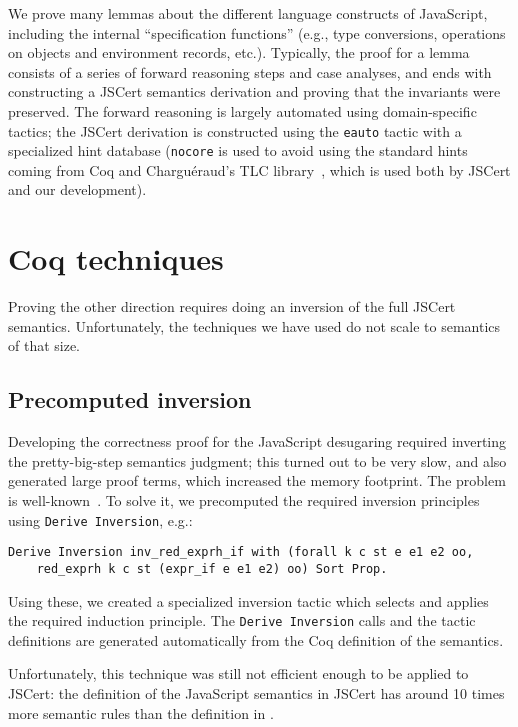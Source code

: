 \documentclass{llncs}
\begin{document}
We prove many lemmas about the different language constructs
of JavaScript, including the internal ``specification functions''
(e.g., type conversions, operations on objects and environment
records, etc.). Typically, the proof for a lemma consists of
a series of forward reasoning steps and case analyses, and ends with
constructing a JSCert semantics derivation and proving that
the invariants were preserved. The forward reasoning is largely
automated using domain-specific tactics; the JSCert derivation
is constructed using the \texttt{eauto} tactic with a specialized
hint database (\texttt{nocore} is used to avoid using the standard
hints coming from Coq and Chargu\'eraud's TLC
library~\cite{TLC}, which is
used both by JSCert and our development).

\section{Coq techniques}
\label{sec:coq-techniques}

Proving the other direction requires doing an inversion of the full JSCert
semantics. Unfortunately, the techniques we have used do not scale to semantics
of that size.

\subsection{Precomputed inversion}

Developing the correctness proof for the JavaScript desugaring required
inverting the \lambdajs pretty-big-step semantics judgment; this
turned out to be very slow, and also generated large proof terms, which 
increased the memory footprint. The problem is well-known~\cite{Monin:Coq2}.
To solve it, we precomputed the required inversion principles
using \texttt{Derive Inversion}, e.g.:
\begin{verbatim}
Derive Inversion inv_red_exprh_if with (forall k c st e e1 e2 oo,
    red_exprh k c st (expr_if e e1 e2) oo) Sort Prop.
\end{verbatim}
Using these, we created a specialized inversion tactic
which selects and applies the required induction principle.
The \texttt{Derive Inversion} calls and the tactic definitions
are generated automatically from the Coq definition of the semantics.

Unfortunately, this technique was still not efficient enough to be
applied to JSCert: the definition of the JavaScript semantics in
JSCert has around 10 times more semantic rules than the definition
in \lambdajs.
\end{document}
